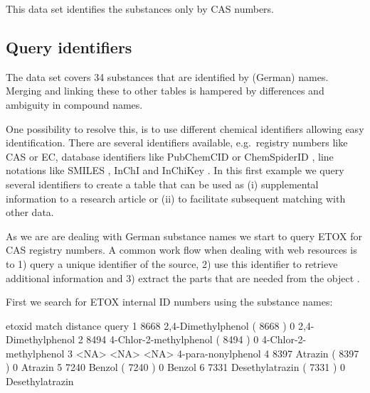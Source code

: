 \documentclass[article, shortnames]{jss}\usepackage[]{graphicx}\usepackage[]{color}
\begin{document}
This data set identifies the substances only by CAS numbers.


\subsection[Query identifiers]{Query identifiers}
The  data set covers 34 substances that are identified by (German) names.
Merging and linking these to other tables is hampered by differences and ambiguity in compound names.

One possibility to resolve this, is to use different chemical identifiers allowing easy identification.
There are several identifiers available, e.g.\  registry numbers like CAS or EC, database identifiers like PubChemCID \citep{Kim_2016} or ChemSpiderID \citep{pence_chemspider:_2010}, line notations like SMILES \citep{Weininger_1990}, InChI and InChiKey \citep{Heller_McNaught_Pletnev_Stein_Tchekhovskoi_2015}. 
In this first example we query several identifiers to create a table that can be used as (i) supplemental information to a research article or (ii) to facilitate subsequent matching with other data.

As we are are dealing with German substance names we start to query ETOX for CAS registry numbers.
A common work flow when dealing with web resources is to 1) query a unique identifier of the source, 2) use this identifier to retrieve additional information and 3) extract the parts that are needed from the  object \citep{Chamberlain_Szocs_2013}.

First we search for ETOX internal ID numbers using the substance names:

\begin{CodeChunk}
\begin{CodeOutput}
  etoxid                           match distance                  query
1   8668     2,4-Dimethylphenol ( 8668 )        0     2,4-Dimethylphenol
2   8494 4-Chlor-2-methylphenol ( 8494 )        0 4-Chlor-2-methylphenol
3   <NA>                            <NA>     <NA>     4-para-nonylphenol
4   8397                Atrazin ( 8397 )        0                Atrazin
5   7240                 Benzol ( 7240 )        0                 Benzol
6   7331        Desethylatrazin ( 7331 )        0        Desethylatrazin
\end{CodeOutput}
\end{CodeChunk}
\end{document}
